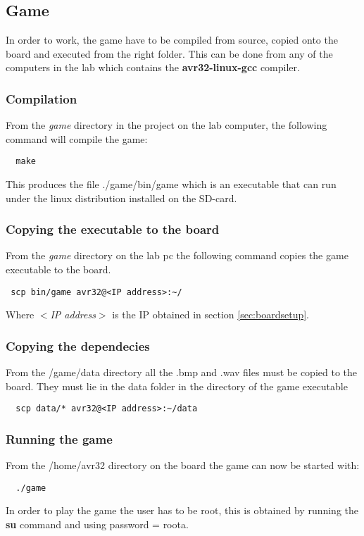 \subsection{Game}

In order to work, the game have to be compiled from source, copied onto the board 
and executed from the right folder.
This can be done from any of the computers in the lab which contains the {\bf avr32-linux-gcc} compiler.

\subsubsection{Compilation}
From the {\it game} directory in the project on the lab computer, the following command will compile the game:
\begin{verbatim}
  make
\end{verbatim}
This produces the file ./game/bin/game which is an executable that can run under 
the linux distribution installed on the SD-card.

\subsubsection{Copying the executable to the board}
From the {\it game} directory on the lab pc the following command copies the game executable to the board.
\begin{verbatim}
 scp bin/game avr32@<IP address>:~/
\end{verbatim}
Where {\it $<$IP address$>$} is the IP obtained in section \ref{sec:boardsetup}.

\subsubsection{Copying the dependecies}
From the /game/data directory all the .bmp and .wav files must be copied to the board. They must
lie in the data folder in the directory of the game executable
\begin{verbatim}
  scp data/* avr32@<IP address>:~/data
\end{verbatim}

\subsubsection{Running the game}
From the /home/avr32 directory on the board the game can now be started with:
\begin{verbatim}
  ./game
\end{verbatim}
In order to play the game the user has to be root, this is obtained by 
running the {\bf su} command
and using password = roota.
